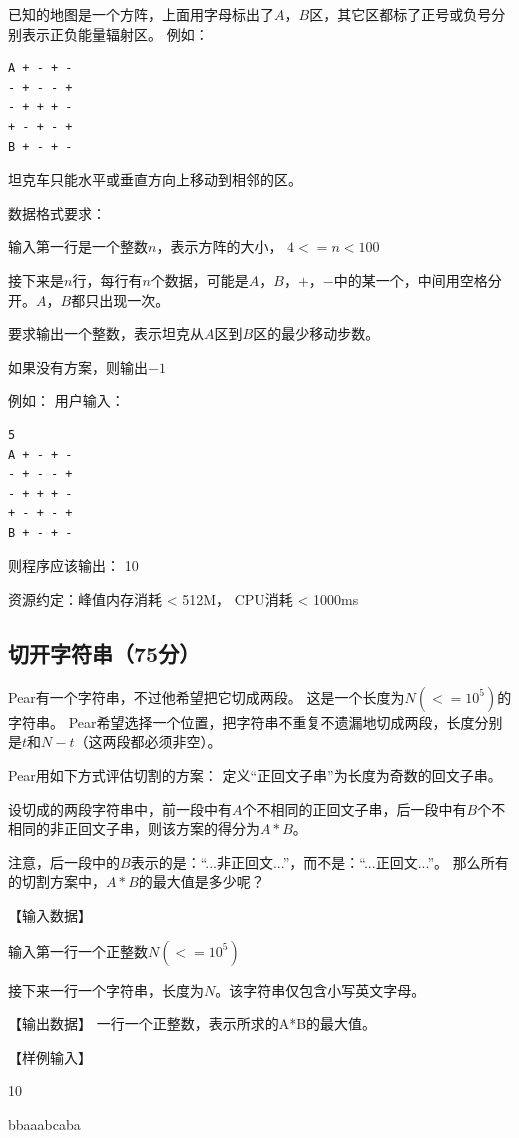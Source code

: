 \documentclass[a4paper, 12pt, twocolumn]{ctexart}
\begin{document}
	已知的地图是一个方阵，上面用字母标出了$A$，$B$区，其它区都标了正号或负号分别表示正负能量辐射区。
	例如：
	\begin{lstlisting}
A + - + -
- + - - +
- + + + -
+ - + - +
B + - + -	
	\end{lstlisting}	
	
	坦克车只能水平或垂直方向上移动到相邻的区。
	
	数据格式要求：
	
	输入第一行是一个整数$n$，表示方阵的大小， $4<=n<100$
	
	接下来是$n$行，每行有$n$个数据，可能是$A$，$B$，$+$，$-$中的某一个，中间用空格分开。$A$，$B$都只出现一次。
	
	要求输出一个整数，表示坦克从$A$区到$B$区的最少移动步数。
	
	如果没有方案，则输出$-1$
	
	例如：
	用户输入：
	\begin{lstlisting}
5
A + - + -
- + - - +
- + + + -
+ - + - +
B + - + -
	\end{lstlisting}
	
	则程序应该输出：
	10
	
	资源约定：峰值内存消耗 < 512M，	CPU消耗  < 1000ms
	
	\subsection{切开字符串（75分）}
	
	Pear有一个字符串，不过他希望把它切成两段。
	这是一个长度为$N(<=10^5)$的字符串。
	Pear希望选择一个位置，把字符串不重复不遗漏地切成两段，长度分别是$t$和$N-t$（这两段都必须非空）。
	
	Pear用如下方式评估切割的方案：
	定义“正回文子串”为长度为奇数的回文子串。
	
	设切成的两段字符串中，前一段中有$A$个不相同的正回文子串，后一段中有$B$个不相同的非正回文子串，则该方案的得分为$A*B$。
	
	注意，后一段中的$B$表示的是：“...非正回文...”，而不是：“...正回文...”。
	那么所有的切割方案中，$A*B$的最大值是多少呢？
	
	【输入数据】
	
	输入第一行一个正整数$N(<=10^5)$
	
	接下来一行一个字符串，长度为$N$。该字符串仅包含小写英文字母。
	
	【输出数据】
	一行一个正整数，表示所求的A*B的最大值。
	
	【样例输入】
	
	10
	
	bbaaabcaba
	
\end{document}
